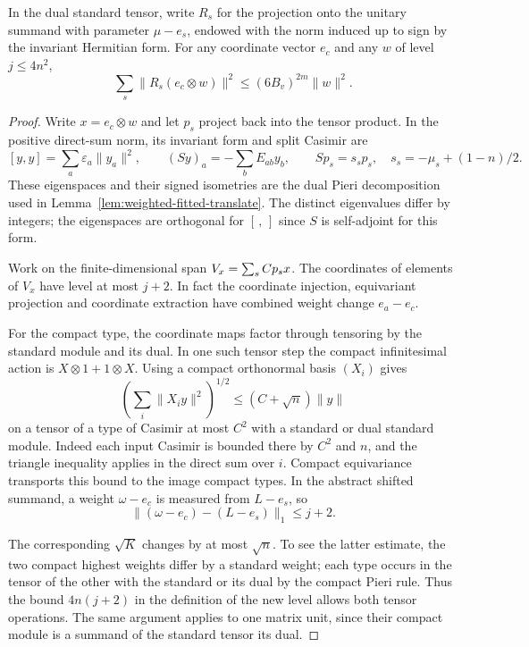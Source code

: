 \begin{auxlemma}\label{lem:paired-spectral-projections}
In the dual standard tensor, write \(R_s\) for the projection onto
the unitary summand with parameter \(\mu-e_s\), endowed with the norm
induced up to sign by the invariant Hermitian form. For any coordinate
vector \(e_c\) and any \(w\) of level \(j\le4n^2\),
\[
        \sum_s\|R_s(e_c\otimes w)\|^2
                       \le (6B_v)^{2m}\|w\|^2 .
\]
\end{auxlemma}
\begin{proof}
Write \(x=e_c\otimes w\) and let \(p_s\) project back into the tensor
product. In the positive direct-sum norm, its invariant form and
split Casimir are
\[
 [y,y]=\sum_a\varepsilon_a\|y_a\|^2,\qquad
 (Sy)_a=-\sum_b E_{ab}y_b,\qquad
 Sp_s=s_s p_s,\quad s_s=-\mu_s+(1-n)/2 .
\]
These eigenspaces and their signed isometries are the dual Pieri
decomposition used in Lemma~\ref{lem:weighted-fitted-translate}.
The distinct eigenvalues differ by integers; the eigenspaces are
orthogonal for \([\,,\,]\) since \(S\) is self-adjoint for this form.

Work on the finite-dimensional span \(V_x=\sum_sC p_s x\).
The coordinates of elements of \(V_x\) have level at most \(j+2\).
In fact the coordinate injection, equivariant projection and
coordinate extraction have combined weight change \(e_a-e_c\).

For the compact type, the coordinate maps factor through tensoring
by the standard module and its dual. In one such tensor step the
compact infinitesimal action is \(X\otimes 1+1\otimes X\).
Using a compact orthonormal basis \((X_i)\) gives
\[
 \left(\sum_i\|X_i y\|^2\right)^{1/2}
 \le (C+\sqrt n)\|y\|
\]
on a tensor of a type of Casimir at most \(C^2\) with a standard
or dual standard module. Indeed each input Casimir is bounded there
by \(C^2\) and \(n\), and the triangle inequality applies in the
direct sum over \(i\). Compact equivariance transports this bound
to the image compact types. 
In the abstract shifted summand, a weight \(\omega-e_c\) is
measured from \(L-e_s\), so
\[
 \|(\omega-e_c)-(L-e_s)\|_1\le j+2 .
\]

The corresponding \(\sqrt K\) changes by at most \(\sqrt n\). To see the latter estimate, the two compact
highest weights differ by a standard weight; each type occurs
in the tensor of the other with the standard or its dual by
the compact Pieri rule. Thus the bound \(4n(j+2)\) in the definition
of the new level allows both tensor operations. The same argument
applies to one matrix unit, since their compact module is a summand
of the standard tensor its dual.


\end{proof}
